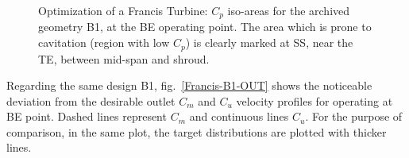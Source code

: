 \begin{figure}[h!]
\begin{minipage}[b]{1\linewidth}
 \centering
\end{minipage}
\caption{Optimization of a Francis Turbine: $C_p$ iso-areas for the archived geometry B1, at the BE operating point. The area which is prone to cavitation (region with low $C_p$) is clearly marked at SS, near the TE, between mid-span and shroud.}
\label{Francis-B1-BE}
\end{figure}

Regarding the same design  B1, fig.\ \ref{Francis-B1-OUT} shows the noticeable deviation from the desirable outlet $C_m$ and $C_u$ velocity profiles for operating at BE point.  Dashed lines represent $C_m$ and continuous lines $C_u$. For the purpose of comparison, in the same plot, the target distributions are plotted with thicker lines.   

